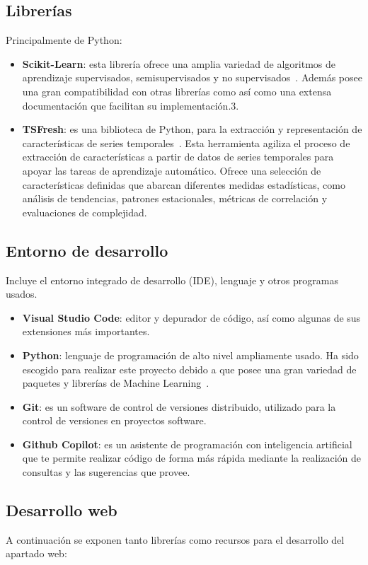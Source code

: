 \subsection{Librerías}
Principalmente de Python:
\begin{itemize}
\item \textbf{Scikit-Learn}: esta librería ofrece una amplia variedad de algoritmos de aprendizaje supervisados, semisupervisados y no supervisados~\cite{sklearnHome}. Además posee una gran compatibilidad con otras librerías como así como una extensa documentación que facilitan su implementación.3.
\item \textbf{TSFresh}: es una biblioteca de Python, para la extracción y representación de características de series temporales~\cite{tsfreshHome}. Esta herramienta agiliza el proceso de extracción de características a partir de datos de series temporales para apoyar las tareas de aprendizaje automático. Ofrece una selección de características definidas que abarcan diferentes medidas estadísticas, como análisis de tendencias, patrones estacionales, métricas de correlación y evaluaciones de complejidad.
\end{itemize}

\subsection{Entorno de desarrollo}
Incluye el entorno integrado de desarrollo (IDE), lenguaje y otros programas usados.
\begin{itemize}
\item \textbf{Visual Studio Code}: editor y depurador de código, así como algunas de sus extensiones más importantes.
\item \textbf{Python}: lenguaje de programación de alto nivel ampliamente usado. Ha sido escogido para realizar este proyecto debido a que posee una gran variedad de paquetes y librerías de Machine Learning~\cite{python}.
\item \textbf{Git}: es un software de control de versiones distribuido, utilizado para la control de versiones en proyectos software.
\item \textbf{Github Copilot}: es un asistente de programación con inteligencia artificial que te permite realizar código de forma más rápida mediante la realización de consultas y las sugerencias que provee.
\end{itemize}
\subsection{Desarrollo web}
A continuación se exponen tanto librerías como recursos para el desarrollo del apartado web:

